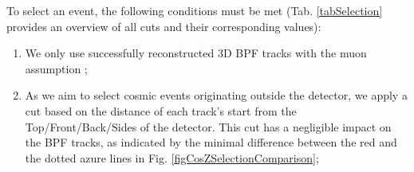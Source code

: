 To select an event, the following conditions must be met (Tab. \ref{tabSelection} provides an overview of all cuts and their corresponding values):
\begin{enumerate}
\item We only use successfully reconstructed 3D BPF tracks with the muon assumption \cite{NOVA-doc-32455-v1};
\item As we aim to select cosmic events originating outside the detector, we apply a cut based on the distance of each track's start from the Top/Front/Back/Sides of the detector. This cut has a negligible impact on the BPF tracks, as indicated by the minimal difference between the red and the dotted azure lines in Fig. \ref{figCosZSelectionComparison};

\begin{figure}[!ht]


\end{figure}
\end{enumerate}
